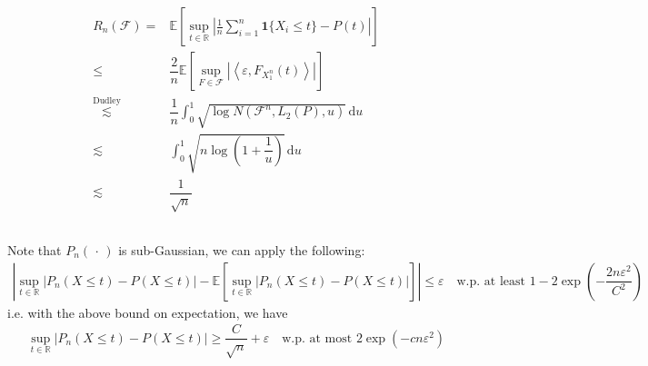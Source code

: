 \documentclass[11pt,a4paper]{ctexart}
\numberwithin{equation}{section}%
\begin{document}
\begin{align*}
    R_n(\mathcal{F})= &\mathbb{E}\left[ \sup_{t\in \mathbb{R}} \left| \frac{1}{n} \sum_{i=1}^n \mathbf{1}\{X_i\leq t\} - P(t) \right| \right] \\
    \leq& \dfrac{ 2 }{ n }  \mathbb{E}\left[ \mathop{ \sup }\limits_{F\in \mathcal{F}} \left\vert \left\langle \varepsilon , F_{X_1^n}(t) \right\rangle  \right\vert   \right] \\
    \mathop{ \lesssim  }\limits^{\mathrm{ Dudley } } &\dfrac{ 1 }{ n }  \int_0^1 \sqrt{ \log N(\mathcal{F}^n, L_2(P), u ) } \,\mathrm{d}u\\
    \lesssim & \int_0^1 \sqrt{n \log (1+\dfrac{ 1 }{ u } ) } \,\mathrm{d}u\\
    \lesssim & \dfrac{ 1 }{ \sqrt{n} } 
\end{align*}

\subsection{}

Note that $ P_n(\, \cdot \, ) $ is sub-Gaussian, we can apply the following:
\begin{align*}
    \left\vert \mathop{ \sup  }\limits_{t\in \mathbb{R}} \left\vert P_n(X\leq t) - P(X\leq t) \right\vert - \mathbb{E}\left[ \mathop{ \sup  }\limits_{t\in \mathbb{R}} \left\vert P_n(X\leq t) - P(X\leq t) \right\vert  \right] \right\vert  \leq \varepsilon \quad \text{w.p. at least } 1-2\exp \left( -\dfrac{ 2n\varepsilon^2 }{ C^2 } \right)
\end{align*}
i.e. with the above bound on expectation, we have
\begin{align*}
     \mathop{ \sup  }\limits_{t\in \mathbb{R}} \left\vert P_n(X\leq t) - P(X\leq t) \right\vert \geq \dfrac{ C }{ \sqrt{n} } +\varepsilon \quad \text{w.p. at most } 2\exp \left( -cn\varepsilon ^2 \right) 
\end{align*}


\section{}
\end{document}
